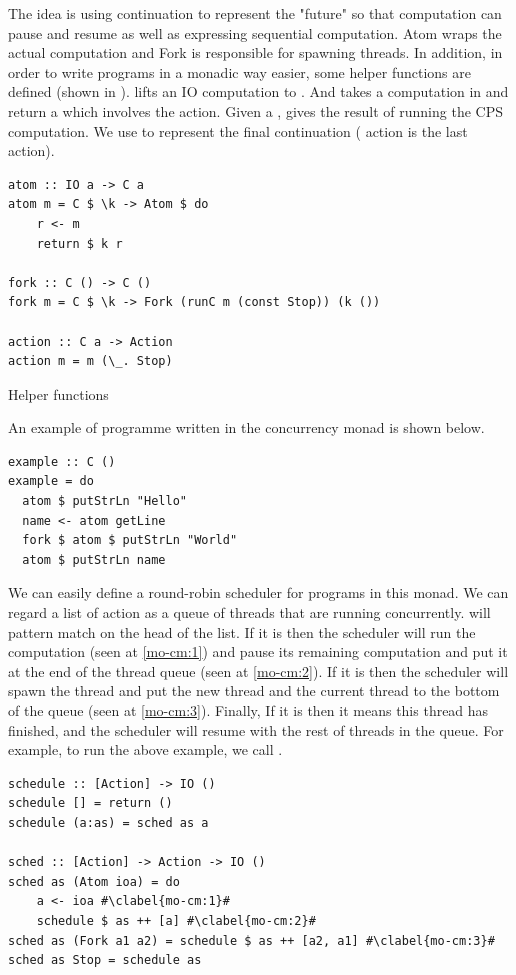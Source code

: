 The idea is using continuation to represent the "future" so that computation can pause and resume as well as expressing sequential computation. Atom wraps the actual computation and Fork is responsible for spawning threads. In addition, in order to write programs in a monadic way easier, some helper functions are defined (shown in ).  lifts an IO computation to . And  takes a computation in  and return a  which involves the  action. Given a ,  gives the result of running the CPS computation. We use  to represent the final continuation ( action is the last action). 
\begin{listing}[ht]
\begin{verbatim}
atom :: IO a -> C a
atom m = C $ \k -> Atom $ do
    r <- m
    return $ k r

fork :: C () -> C ()
fork m = C $ \k -> Fork (runC m (const Stop)) (k ())

action :: C a -> Action
action m = m (\_. Stop)
\end{verbatim}
\caption{Helper functions}
\label{b:mo:helper}
\end{listing}
An example of programme written in the concurrency monad is shown below.
\begin{code}
  \begin{verbatim}
example :: C ()
example = do 
  atom $ putStrLn "Hello" 
  name <- atom getLine 
  fork $ atom $ putStrLn "World"
  atom $ putStrLn name
  \end{verbatim}
\end{code}
We can easily define a round-robin scheduler for programs in this monad. We can regard a list of action as a queue of threads that are running concurrently.  will pattern match on the head of the list. If it is  then the scheduler will run the computation (seen  at \cref{mo-cm:1}) and pause its remaining computation and put it at the end of the thread queue (seen at \cref{mo-cm:2}). If it is  then the scheduler will spawn the thread and put the new thread and the current thread to the bottom of the queue (seen at \cref{mo-cm:3}). Finally, If it is  then it means this thread has finished, and the scheduler will resume with the rest of threads in the queue. For example, to run the above example, we call .
\begin{code}
  \begin{verbatim}
schedule :: [Action] -> IO () 
schedule [] = return ()
schedule (a:as) = sched as a

sched :: [Action] -> Action -> IO ()
sched as (Atom ioa) = do
    a <- ioa #\clabel{mo-cm:1}#
    schedule $ as ++ [a] #\clabel{mo-cm:2}#
sched as (Fork a1 a2) = schedule $ as ++ [a2, a1] #\clabel{mo-cm:3}#
sched as Stop = schedule as
  \end{verbatim}
\end{code}

